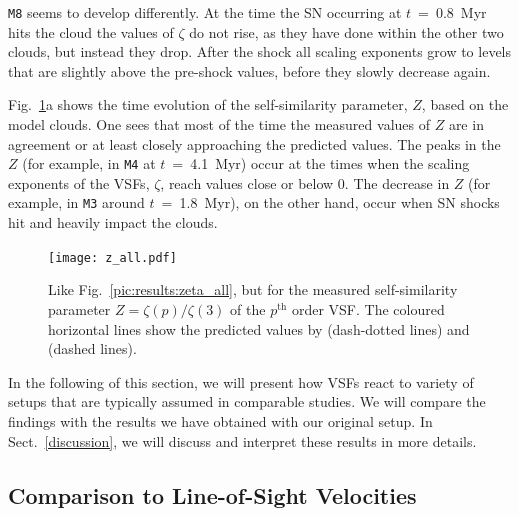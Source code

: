 \texttt{M8} seems to develop differently.
At the time the SN occurring at $t$~=~0.8~Myr hits the cloud the values of $\zeta$ do not rise, as they have done within the other two clouds, but instead they drop. 
After the shock all scaling exponents grow to levels that are slightly above the pre-shock values, before they slowly decrease again.

Fig.~\ref{pic:results:z_all}a shows the time evolution of the self-similarity parameter, $Z$, based on the model clouds. 
One sees that most of the time the measured values of $Z$ are in agreement or at least closely approaching the predicted values.
The peaks in the $Z$ (for example, in \texttt{M4} at $t$~=~4.1~Myr) occur at the times when the scaling exponents of the VSFs, $\zeta$, reach values close or below 0.
The decrease in $Z$ (for example, in \texttt{M3} around $t$~=~1.8~Myr), on the other hand, occur when SN shocks hit and heavily impact the clouds. 

\begin{figure}[!htb]
	\centering
	\texttt{[image: z\_all.pdf]}
	\caption{ Like Fig.~\ref{pic:results:zeta_all}, but for the measured self-similarity parameter $Z = \zeta(p) / \zeta(3)$ of the $p^\mathrm{th}$ order VSF. The coloured horizontal lines show the predicted values by \citet{She1994} (dash-dotted lines) and \citet{Boldyrev2002} (dashed lines).
	}
	\label{pic:results:z_all}
\end{figure}

In the following of this section, we will present how VSFs react to variety of setups that are typically assumed in comparable studies.
We will compare the findings with the results we have obtained with our original setup.
In Sect.~\ref{discussion}, we will discuss and interpret these results in more details.


\subsection{Comparison to Line-of-Sight Velocities}\label{results:1d}

